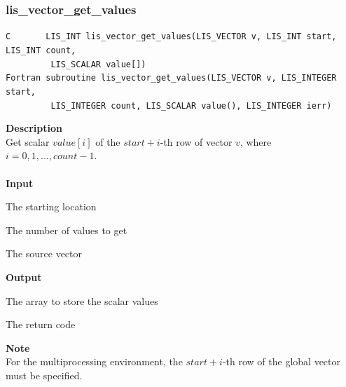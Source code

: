 \documentclass[a4paper]{article}
\newcommand{\namelistlabel}[1]{\mbox{#1}\hfill}
\newenvironment{namelist}[1]{%
\begin{list}{}
  {\let\makelabel\namelistlabel
  \settowidth{\labelwidth}{#1}
  \setlength{\leftmargin}{1.1\labelwidth}}
  }{%
\end{list}}
\begin{document}
\subsubsection{lis\_vector\_get\_values}
\begin{screen}
\verb|C       LIS_INT lis_vector_get_values(LIS_VECTOR v, LIS_INT start, LIS_INT count,|\\
\verb|         LIS_SCALAR value[])|\\
\verb|Fortran subroutine lis_vector_get_values(LIS_VECTOR v, LIS_INTEGER start,|\\
\verb|         LIS_INTEGER count, LIS_SCALAR value(), LIS_INTEGER ierr)|
\end{screen}
{\bf Description}\\
\indent
Get scalar $value[i]$ of the $start+i$-th row of vector $v$, 
where $i=0,1,...,count-1$.
\\ \\
\noindent
{\bf Input}
\begin{namelist}{XXXXXXXXXXXXXXXXXXXX}
\item[\tt start] The starting location 
\item[\tt count] The number of values to get
\item[\tt v] The source vector
\end{namelist}
{\bf Output}
\begin{namelist}{XXXXXXXXXXXXXXXXXXXX}
\item[\tt value] The array to store the scalar values
\item[\tt ierr] The return code
\end{namelist}
{\bf Note}\\
\indent
For the multiprocessing environment, the $start+i$-th row of the global vector
must be specified.
\end{document}
